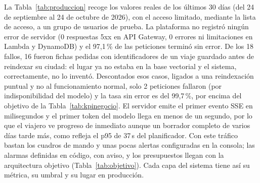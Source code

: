 La Tabla~\ref{tab:produccion} recoge los valores reales de los últimos 30 días (del 24 de
septiembre al 24 de octubre de 2026), con el acceso limitado, mediante la lista de acceso, a un
grupo de usuarios de prueba. La plataforma no registró ningún error de servidor (0 respuestas 5xx
en API Gateway, 0 errores ni limitaciones en Lambda y DynamoDB) y el 97,1\,\% de las peticiones terminó
sin error. De los 18 fallos, 16 fueron fichas pedidas con identificadores de un viaje guardado
antes de reindexar su ciudad: el lugar ya no estaba en la base vectorial y el sistema,
correctamente, no lo inventó. Descontados esos casos, ligados a una reindexación puntual y no al
funcionamiento normal, solo 2 peticiones fallaron (por indisponibilidad del modelo) y la tasa
sin error es del 99,7\,\%, por encima del objetivo de la Tabla~\ref{tab:kpinegocio}. El servidor
emite el primer evento SSE en milisegundos y el primer token del modelo llega en menos de un
segundo, por lo que el viajero ve progreso de inmediato aunque un borrador completo de varios días
tarde más, como refleja el p95 de 37\,s del planificador. Con este tráfico bastan los cuadros de
mando y unas pocas alertas configuradas en la consola; las alarmas definidas en código, con aviso,
y los presupuestos llegan con la arquitectura objetivo
(Tabla~\ref{tab:objetivo}). Cada capa del sistema tiene así su métrica, su umbral y su lugar en
producción.

